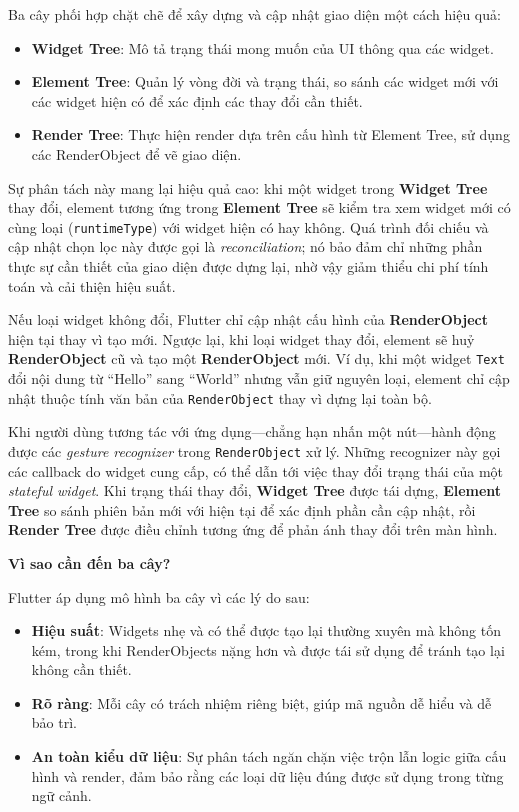 \documentclass[../DoAn.tex]{subfiles}
\numberwithin{figure}{chapter}
\begin{document}
Ba cây phối hợp chặt chẽ để xây dựng và cập nhật giao diện một cách hiệu quả:

\begin{itemize}
    \item \textbf{Widget Tree}: Mô tả trạng thái mong muốn của UI thông qua các widget.
    \item \textbf{Element Tree}: Quản lý vòng đời và trạng thái, so sánh các widget mới với các widget hiện có để xác định các thay đổi cần thiết.
    \item \textbf{Render Tree}: Thực hiện render dựa trên cấu hình từ Element Tree, sử dụng các RenderObject để vẽ giao diện.
\end{itemize}

Sự phân tách này mang lại hiệu quả cao: khi một widget trong \textbf{Widget Tree} thay đổi, element tương ứng trong \textbf{Element Tree} sẽ kiểm tra xem widget mới có cùng loại (\texttt{runtimeType}) với widget hiện có hay không. Quá trình đối chiếu và cập nhật chọn lọc này được gọi là \textit{reconciliation}; nó bảo đảm chỉ những phần thực sự cần thiết của giao diện được dựng lại, nhờ vậy giảm thiểu chi phí tính toán và cải thiện hiệu suất.

Nếu loại widget không đổi, Flutter chỉ cập nhật cấu hình của \textbf{RenderObject} hiện tại thay vì tạo mới. Ngược lại, khi loại widget thay đổi, element sẽ huỷ \textbf{RenderObject} cũ và tạo một \textbf{RenderObject} mới. Ví dụ, khi một widget \texttt{Text} đổi nội dung từ ``Hello'' sang ``World'' nhưng vẫn giữ nguyên loại, element chỉ cập nhật thuộc tính văn bản của \texttt{RenderObject} thay vì dựng lại toàn bộ.

Khi người dùng tương tác với ứng dụng—chẳng hạn nhấn một nút—hành động được các \emph{gesture recognizer} trong \texttt{RenderObject} xử lý. Những recognizer này gọi các callback do widget cung cấp, có thể dẫn tới việc thay đổi trạng thái của một \emph{stateful widget}. Khi trạng thái thay đổi, \textbf{Widget Tree} được tái dựng, \textbf{Element Tree} so sánh phiên bản mới với hiện tại để xác định phần cần cập nhật, rồi \textbf{Render Tree} được điều chỉnh tương ứng để phản ánh thay đổi trên màn hình.


\textbf{Vì sao cần đến ba cây?}

Flutter áp dụng mô hình ba cây vì các lý do sau:
\begin{itemize}
    \item \textbf{Hiệu suất}: Widgets nhẹ và có thể được tạo lại thường xuyên mà không tốn kém, trong khi RenderObjects nặng hơn và được tái sử dụng để tránh tạo lại không cần thiết.
    \item \textbf{Rõ ràng}: Mỗi cây có trách nhiệm riêng biệt, giúp mã nguồn dễ hiểu và dễ bảo trì. 
    \item \textbf{An toàn kiểu dữ liệu}: Sự phân tách ngăn chặn việc trộn lẫn logic giữa cấu hình và render, đảm bảo rằng các loại dữ liệu đúng được sử dụng trong từng ngữ cảnh.
\end{itemize}
\end{document}
